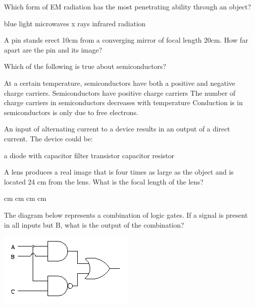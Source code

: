 \documentclass[12pt,addpoints]{exam}
\begin{document}
{{{\begin{questions}
					\question Which form of EM radiation has the most penetrating ability through an object?\\
					\begin{oneparchoices}
						\choice blue light
						\choice microwaves
						\choice x rays
						\choice infrared radiation
					\end{oneparchoices}
					\question A pin stands erect 10cm from a converging mirror of focal length 20cm. How far apart are the pin and its image? \\
					\begin{oneparchoices}
						\choice 10cm
						\choice 7cm
						\choice 20cm
						\choice 30cm
					\end{oneparchoices}
					\question Which of the following is true about semiconductors?
					\begin{choices}
						\choice At a certain temperature, semiconductors have both a positive and negative charge carriers.
						\choice Semiconductors have positive charge carriers
						\choice The number of charge carriers in semiconductors decreases with temperature
						\choice Conduction is in semiconductors is only due to free electrons.
					\end{choices}
					\question An input of alternating current to a device results in an output of a direct current. The device could be: \\
					\begin{oneparchoices}
						\choice a diode with capacitor filter
						\choice transistor
						\choice capacitor
						\choice resistor
					\end{oneparchoices}
					\question A lens produces a real image that is four times as large as the object and is located 24 cm from the lens. What is the focal length of the lens? \\
					\begin{oneparchoices}
						\choice 4 cm
						\choice 8 cm
						\choice 6 cm
						\choice 4.8 cm
					\end{oneparchoices}
					\question The diagram below represents a combination of logic gates. If a signal is present in all inputs but B, what is the output of the combination? \\
					\begin{center}
						\includegraphics[scale=0.6]{gate}

\end{center}
\end{questions}}}}
\end{document}
